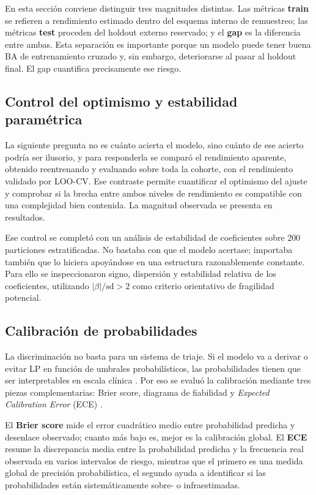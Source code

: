 En esta sección conviene distinguir tres magnitudes distintas. Las métricas \textbf{train} se refieren a rendimiento
estimado dentro del esquema interno de remuestreo; las métricas \textbf{test} proceden del holdout externo reservado; y el \textbf{gap} es la diferencia entre ambas. Esta separación es importante porque un modelo puede tener buena BA de entrenamiento cruzado y, sin embargo, deteriorarse al pasar al holdout final. El gap cuantifica precisamente ese riesgo.

\subsection{Control del optimismo y estabilidad paramétrica}

La siguiente pregunta no es cuánto acierta el modelo, sino cuánto de ese acierto podría ser ilusorio, y para responderla
se comparó el rendimiento aparente, obtenido reentrenando y evaluando sobre toda la cohorte, con el rendimiento validado
por LOO-CV. Ese contraste permite cuantificar el optimismo del ajuste y comprobar si la brecha entre ambos niveles de
rendimiento es compatible con una complejidad bien contenida. La magnitud observada se presenta en resultados.

Ese control se completó con un análisis de estabilidad de coeficientes sobre 200 particiones estratificadas. No bastaba
con que el modelo acertase; importaba también que lo hiciera apoyándose en una estructura razonablemente constante. Para
ello se inspeccionaron signo, dispersión y estabilidad relativa de los coeficientes, utilizando $|\beta|/\mathrm{sd} > 2$
como criterio orientativo de fragilidad potencial.

\subsection{Calibración de probabilidades}

La discriminación no basta para un sistema de triaje. Si el modelo va a derivar o evitar LP en función de umbrales probabilísticos, las probabilidades tienen que ser interpretables en escala clínica \parencite{platt1999probabilistic}. Por eso se evaluó la calibración mediante tres piezas complementarias: Brier score, diagrama de fiabilidad y \textit{Expected Calibration Error} (ECE) \parencite{guo2017calibration}.

El \textbf{Brier score} mide el error cuadrático medio entre probabilidad predicha y desenlace observado; cuanto más
bajo es, mejor es la calibración global. El \textbf{ECE} resume la discrepancia media entre la probabilidad predicha y
la frecuencia real observada en varios intervalos de riesgo, mientras que el primero es una medida global de precisión
probabilística, el segundo ayuda a identificar si las probabilidades están sistemáticamente sobre- o infraestimadas.

